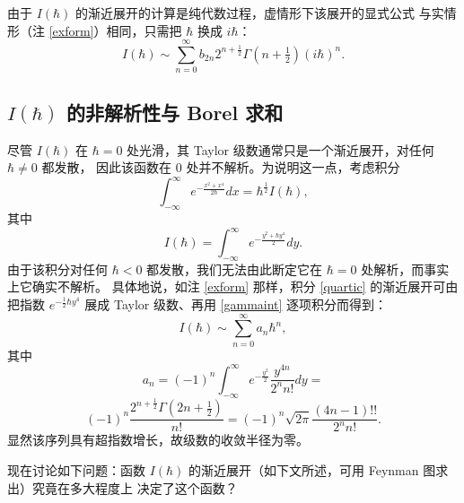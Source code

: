 \begin{remark}\label{exform1} 由于 $I(\hbar)$ 的渐近展开的计算是纯代数过程，虚情形下该展开的显式公式
与实情形（注 \ref{exform}）相同，只需把 $\hbar$ 换成 $i\hbar$：
$$
I(\hbar)\sim \sum_{n=0}^\infty b_{2n}2^{n+\frac{1}{2}}\Gamma(n+\tfrac{1}{2})(i\hbar)^n. 
$$
\end{remark}


\subsection{$I(\hbar)$ 的非解析性与 Borel 求和}
尽管 $I(\hbar)$ 在 $\hbar=0$ 处光滑，其 Taylor 级数通常只是一个渐近展开，对任何 $\hbar\ne 0$ 都发散，
因此该函数在 $0$ 处并不解析。为说明这一点，考虑积分
$$
\int_{-\infty}^\infty e^{-\frac{x^2+x^4}{2\hbar}}dx=
\hbar^{\frac{1}{2}}I(\hbar),
$$
其中
\begin{equation}\label{quartic} 
I(\hbar)=
\int_{-\infty}^\infty e^{-\frac{y^2+\hbar y^4}{2}}dy.
\end{equation} 
由于该积分对任何 $\hbar<0$ 都发散，我们无法由此断定它在 $\hbar=0$ 处解析，而事实上它确实不解析。
具体地说，如注 \ref{exform} 那样，积分 \eqref{quartic} 的渐近展开可由把指数 $e^{-\frac{1}{2}\hbar y^4}$
展成 Taylor 级数、再用 \eqref{gammaint} 逐项积分而得到：
$$
I(\hbar)\sim \sum_{n=0}^\infty a_n\hbar^n,
$$
其中
$$
a_n=(-1)^n\int_{-\infty}^\infty 
e^{-\frac{y^2}{2}}\frac{y^{4n}}{2^n n!}dy=
$$
$$
(-1)^n\frac{2^{n+\frac{1}{2}}\Gamma(2n+\frac{1}{2})}{n!}=(-1)^n\sqrt{2\pi}\frac{(4n-1)!!}{2^nn!}.
$$
显然该序列具有超指数增长，故级数的收敛半径为零。

现在讨论如下问题：函数 $I(\hbar)$ 的渐近展开（如下文所述，可用 Feynman 图求出）究竟在多大程度上
决定了这个函数？

